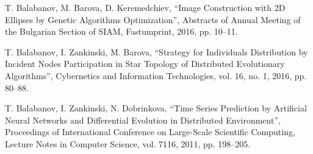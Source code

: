 \documentclass[conference]{IEEEtran}
\begin{document}
\begin{thebibliography}{00}
 T. Balabanov, M. Barova, D. Keremedchiev, ``Image Construction with 2D Ellipses by Genetic Algorithms Optimization'', Abstracts of Annual Meeting of the Bulgarian Section of SIAM, Fastumprint, 2016, pp. 10--11.

 T. Balabanov, I. Zankinski, M. Barova, ``Strategy for Individuals Distribution by Incident Nodes Participation in Star Topology of Distributed Evolutionary Algorithms'', Cybernetics and Information Technologies, vol. 16, no. 1, 2016, pp. 80--88.

 T. Balabanov, I. Zankinski, N. Dobrinkova, ``Time Series Prediction by Artificial Neural Networks and Differential Evolution in Distributed Environment'', Proceedings of International Conference on Large-Scale Scientific Computing, Lecture Notes in Computer Science, vol. 7116, 2011, pp. 198--205.

\end{thebibliography}
\end{document}
